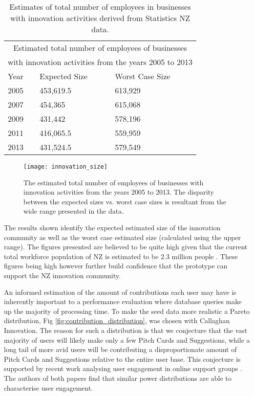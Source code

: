 \begin {table}[H]
\begin{center}
\begin{tabular}{ |p{2cm}||p{3cm}|p{3cm}|  }
 \hline
 \multicolumn{3}{|c|}{Estimated total number of employees of businesses}\\
 \multicolumn{3}{|c|}{with innovation activities from the years 2005 to 2013} \\
 \hline
 Year & Expected Size & Worst Case Size\\
 \hline
    2005 & 453,619.5 & 613,929\\
 \hline
    2007 & 454,365 & 615,068\\
 \hline
    2009 & 431,442 & 578,196\\
 \hline
    2011 & 416,065.5 & 559,959\\
 \hline
    2013 & 431,524.5 & 579,549\\
 \hline
\end{tabular}
\end{center}
\caption {Estimates of total number of employees in businesses with innovation activities derived from Statistics NZ data.} \label{tab:title} 
\end {table}

\begin{figure}[ht]
    \centering
    \texttt{[image: innovation\_size]}
    \caption{The estimated total number of employees of businesses with innovation activities from the years 2005 to 2013. The disparity between the expected sizes vs. worst case sizes is resultant from the wide range presented in the data.}
    \label{fig:innovation_size}
\end{figure}

The results shown identify the expected estimated size of the innovation community as well as the worst case estimated size (calculated using the upper range). The figures presented are believed to be quite high given that the current total workforce population of NZ is estimated to be 2.3 million people \cite{WorkingPopulation:online}. These figures being high however further build confidence that the prototype can support the NZ innovation community.

An informed estimation of the amount of contributions each user may have is inherently important to a performance evaluation where database queries make up the majority of processing time. To make the seed data more realistic a Pareto distribution, Fig \ref{fig:contribution_distribution}, was chosen with Callaghan Innovation. The reason for such a distribution is that we conjecture that the vast majority of users will likely make only a few Pitch Cards and Suggestions, while a long tail of more avid users will be contributing a disproportionate amount of Pitch Cards and Suggestions relative to the entire user base. This conjecture is supported by recent work analysing user engagement in online support groups \cite{carron2014describing}\cite{van2015mapping}. The authors of both papers find that similar power distributions are able to characterise user engagement.

